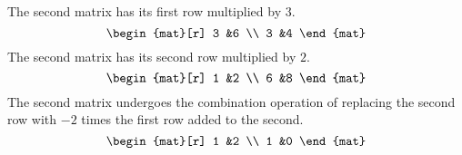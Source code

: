 \begin{Answer}
\Question The second matrix has its first row multiplied 
          by \( 3 \).
          \begin{equation*}
            \begin{mat}[r]
              3  &6  \\
              3  &4
            \end{mat}
          \end{equation*}
\Question The second matrix has its second row multiplied by \( 2 \).
          \begin{equation*}
            \begin{mat}[r]
              1  &2  \\
              6  &8
            \end{mat}
          \end{equation*}
\Question The second matrix undergoes the combination operation
          of replacing the second row with \( -2 \) times the first row added
          to the second.
          \begin{equation*}
            \begin{mat}[r]
              1  &2  \\
              1  &0
            \end{mat}
          \end{equation*}
\end{Answer}
